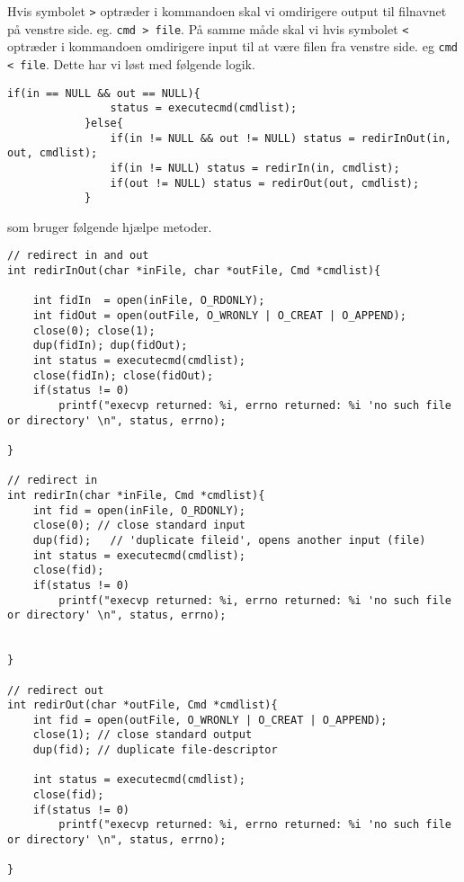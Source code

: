 \documentclass[danish]{report}
\begin{document}
Hvis symbolet {\tt >} optræder i kommandoen skal vi omdirigere output til filnavnet på venstre side. eg. {\tt cmd > file}. På samme måde skal vi hvis symbolet {\tt <} optræder i kommandoen omdirigere input til at være filen fra venstre side. eg {\tt cmd < file}. Dette har vi løst med følgende logik.

\begin{lstlisting}
if(in == NULL && out == NULL){
                status = executecmd(cmdlist);
            }else{
                if(in != NULL && out != NULL) status = redirInOut(in, out, cmdlist);
                if(in != NULL) status = redirIn(in, cmdlist);
                if(out != NULL) status = redirOut(out, cmdlist);
            }
\end{lstlisting}

som bruger følgende hjælpe metoder.

\begin{lstlisting}
// redirect in and out
int redirInOut(char *inFile, char *outFile, Cmd *cmdlist){
    
    int fidIn  = open(inFile, O_RDONLY);
    int fidOut = open(outFile, O_WRONLY | O_CREAT | O_APPEND);              
    close(0); close(1);
    dup(fidIn); dup(fidOut);
    int status = executecmd(cmdlist);
    close(fidIn); close(fidOut);
    if(status != 0) 
        printf("execvp returned: %i, errno returned: %i 'no such file or directory' \n", status, errno);

}

// redirect in
int redirIn(char *inFile, Cmd *cmdlist){
    int fid = open(inFile, O_RDONLY);  
    close(0); // close standard input
    dup(fid);   // 'duplicate fileid', opens another input (file)    
    int status = executecmd(cmdlist);
    close(fid);             
    if(status != 0) 
        printf("execvp returned: %i, errno returned: %i 'no such file or directory' \n", status, errno);


}

// redirect out
int redirOut(char *outFile, Cmd *cmdlist){
    int fid = open(outFile, O_WRONLY | O_CREAT | O_APPEND);         
    close(1); // close standard output
    dup(fid); // duplicate file-descriptor

    int status = executecmd(cmdlist);
    close(fid);             
    if(status != 0) 
        printf("execvp returned: %i, errno returned: %i 'no such file or directory' \n", status, errno);

}
\end{lstlisting}
\end{document}
